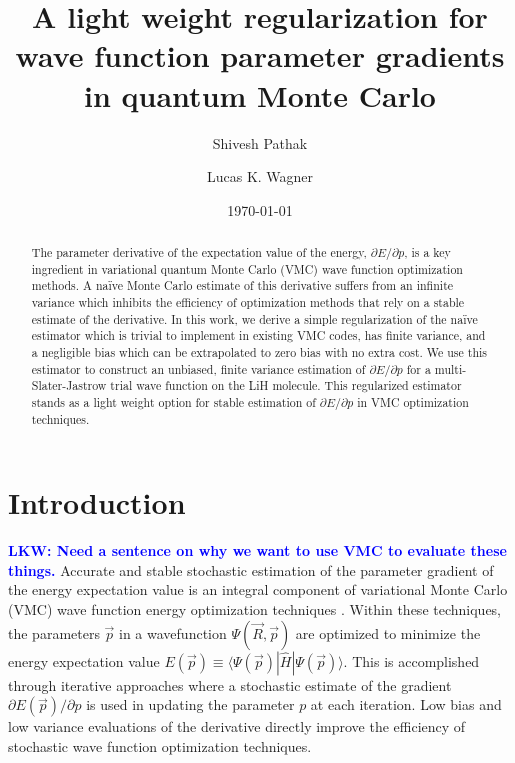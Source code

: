 \documentclass[twocolumn]{revtex4-1}
\newcommand{\lucas}[1]{\textbf{\textcolor{blue}{LKW: #1}}}
\begin{document}
\title{A light weight regularization for wave function parameter gradients
\\ in quantum Monte Carlo}

\author{Shivesh Pathak}

\author{Lucas K. Wagner}

\date{\today}
\begin{abstract}
The parameter derivative of the expectation value of the energy, $\partial E/\partial p$, is a key ingredient in variational quantum Monte Carlo (VMC) wave function optimization methods.
A na\"ive Monte Carlo estimate of this derivative suffers from an infinite variance which inhibits the efficiency of optimization methods that rely on a stable estimate of the derivative.
In this work, we derive a simple regularization of the na\"ive estimator which is trivial to implement in existing VMC codes, has finite variance, and a negligible bias which can be extrapolated to zero bias with no extra cost.
We use this estimator to construct an unbiased, finite variance estimation of $\partial E/\partial p$ for a multi-Slater-Jastrow trial wave function on the LiH molecule.
This regularized estimator stands as a light weight option for stable estimation of $\partial E/\partial p$ in VMC optimization techniques.
\end{abstract}
\maketitle 

\section{Introduction}

\lucas{Need a sentence on why we want to use VMC to evaluate these things.}
Accurate and stable stochastic estimation of the parameter gradient of the energy expectation value is an integral component of variational Monte Carlo (VMC) wave function energy optimization techniques \cite{PhysRevB.64.024512, doi:10.1063/1.1604379, Toulouse2007, Umrigar2005, Umrigar2007, Toulouse2008}.
Within these techniques, the parameters $\vec{p}$ in a wavefunction $\Psi(\vec{R},\vec{p})$ are optimized to minimize the energy expectation value $E(\vec{p}) \equiv \langle \Psi(\vec{p})|\hat{H} |\Psi(\vec{p})\rangle$.
This is accomplished through iterative approaches where a stochastic estimate of the gradient $\partial E(\vec{p})/\partial p$ is used in updating the parameter $p$ at each iteration. 
Low bias and low variance evaluations of the derivative directly improve the efficiency of stochastic wave function optimization techniques. 
\end{document}
